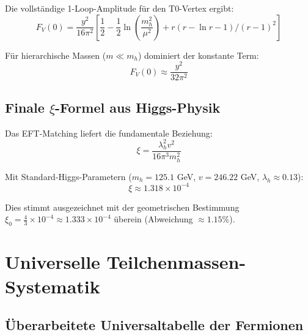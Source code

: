 \documentclass[12pt,a4paper]{article}
\begin{document}
	Die vollständige 1-Loop-Amplitude für den T0-Vertex ergibt:
	\begin{equation}
		F_V(0) = \frac{y^2}{16\pi^2}\left[\frac{1}{2} - \frac{1}{2}\ln\left(\frac{m_h^2}{\mu^2}\right) + r(r-\ln r-1)/(r-1)^2\right]
	\end{equation}
	
	Für hierarchische Massen ($m \ll m_h$) dominiert der konstante Term:
	\begin{equation}
		F_V(0) \approx \frac{y^2}{32\pi^2}
	\end{equation}
	
	\subsection{Finale $\xi$-Formel aus Higgs-Physik}
	\label{subsec:finale_xi_formel}
	
	Das EFT-Matching liefert die fundamentale Beziehung:
	\begin{equation}
		\boxed{\xi = \frac{\lambda_h^2 v^2}{16\pi^3 m_h^2}}
	\end{equation}
	
	Mit Standard-Higgs-Parametern ($m_h = 125.1$ GeV, $v = 246.22$ GeV, $\lambda_h \approx 0.13$):
	\begin{equation}
		\xi \approx 1.318 \times 10^{-4}
	\end{equation}
	
	Dies stimmt ausgezeichnet mit der geometrischen Bestimmung $\xi_0 = \frac{4}{3} \times 10^{-4} \approx 1.333 \times 10^{-4}$ überein (Abweichung $\approx 1.15\%$).
	
	\section{Universelle Teilchenmassen-Systematik}
	\label{sec:universal_masses}
	
	\subsection{Überarbeitete Universaltabelle der Fermionen}
	\label{subsec:universal_table}
	
\end{document}
